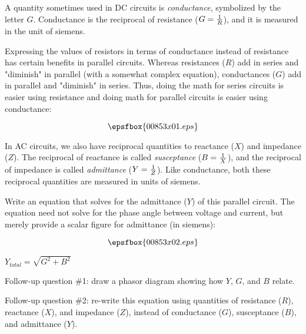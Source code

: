 

A quantity sometimes used in DC circuits is {\it conductance}, symbolized by the letter $G$.  Conductance is the reciprocal of resistance ($G = {1 \over R}$), and it is measured in the unit of siemens.

Expressing the values of resistors in terms of conductance instead of resistance has certain benefits in parallel circuits.  Whereas resistances ($R$) add in series and "diminish" in parallel (with a somewhat complex equation), conductances ($G$) add in parallel and "diminish" in series.  Thus, doing the math for series circuits is easier using resistance and doing math for parallel circuits is easier using conductance:

$$\epsfbox{00853x01.eps}$$

In AC circuits, we also have reciprocal quantities to reactance ($X$) and impedance ($Z$).  The reciprocal of reactance is called {\it susceptance} ($B = {1 \over X}$), and the reciprocal of impedance is called {\it admittance} ($Y = {1 \over Z}$).  Like conductance, both these reciprocal quantities are measured in units of siemens.

Write an equation that solves for the admittance ($Y$) of this parallel circuit.  The equation need not solve for the phase angle between voltage and current, but merely provide a scalar figure for admittance (in siemens):

$$\epsfbox{00853x02.eps}$$







$Y_{total} = \sqrt{G^2 + B^2}$

\vskip 10pt

Follow-up question \#1: draw a phasor diagram showing how $Y$, $G$, and $B$ relate.

\vskip 10pt

Follow-up question \#2: re-write this equation using quantities of resistance ($R$), reactance ($X$), and impedance ($Z$), instead of conductance ($G$), susceptance ($B$), and admittance ($Y$).






